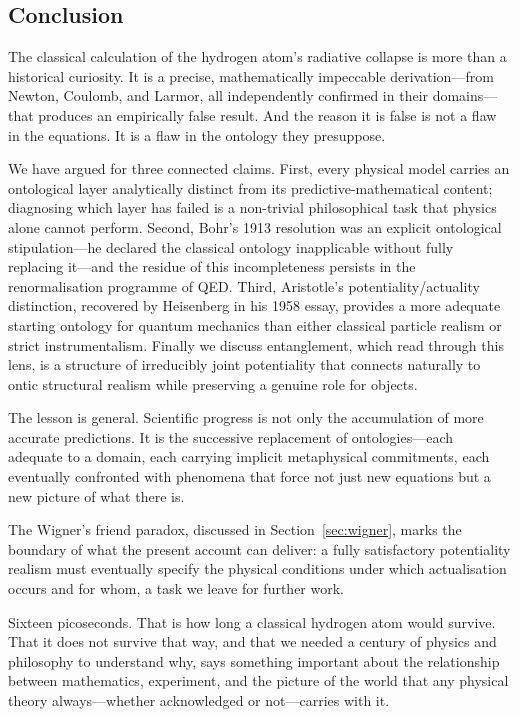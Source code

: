 \subsection{Conclusion}

The classical calculation of the hydrogen atom's radiative collapse is more than a historical curiosity. It is a precise, mathematically impeccable derivation---from Newton, Coulomb, and Larmor, all independently confirmed in their domains---that produces an empirically false result. And the reason it is false is not a flaw in the equations. It is a flaw in the ontology they presuppose.

\medskip

We have argued for three connected claims. First, every physical model carries an ontological layer analytically distinct from its predictive-mathematical content; diagnosing which layer has failed is a non-trivial philosophical task that physics alone cannot perform. Second, Bohr's 1913 resolution was an explicit ontological stipulation---he declared the classical ontology inapplicable without fully replacing it---and the residue of this incompleteness persists in the renormalisation programme of QED. Third, Aristotle's potentiality/actuality distinction, recovered by Heisenberg in his 1958 essay, provides a more adequate starting ontology for quantum mechanics than either classical particle realism or strict instrumentalism. Finally we discuss entanglement, which read through this lens, is a structure of irreducibly joint potentiality that connects naturally to ontic structural realism while preserving a genuine role for objects.

\medskip

The lesson is general. Scientific progress is not only the accumulation of more accurate predictions. It is the successive replacement of ontologies---each adequate to a domain, each carrying implicit metaphysical commitments, each eventually confronted with phenomena that force not just new equations but a new picture of what there is.

\medskip

The Wigner's friend paradox, discussed in Section~\ref{sec:wigner},
marks the boundary of what the present account can deliver: a fully
satisfactory potentiality realism must eventually specify the
physical conditions under which actualisation occurs and for whom,
a task we leave for further work.

\medskip

Sixteen picoseconds. That is how long a classical hydrogen atom would survive. That it does not survive that way, and that we needed a century of physics and philosophy to understand why, says something important about the relationship between mathematics, experiment, and the picture of the world that any physical theory always---whether acknowledged or not---carries with it.
